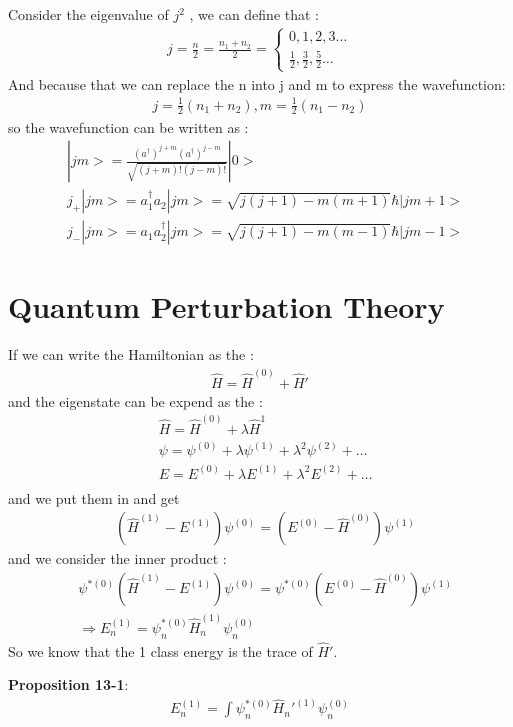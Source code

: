 \documentclass{article}
\begin{document}
Consider the eigenvalue of $j^2$ , we can define that :
\begin{align}
  j=\frac n2=\frac{n_1+n_2}{2}=\begin{cases}
0,1,2,3\dots \\
\frac12,\frac32,\frac52 \dots
  \end{cases}
\end{align}
And because that we can replace the n into j and m to express the wavefunction:
\begin{align}
  j=\frac12(n_1+n_2),m=\frac12(n_1-n_2)
\end{align}
so the wavefunction can be written as :
\begin{align}
  &|jm>=\frac{(a^{\dagger})^{j+m}(a^{\dagger})^{j-m}}{\sqrt{(j+m)!(j-m)!}}|0>\\
  & j_+|jm>=a_1^{\dagger}a_2 |jm>=\sqrt{j(j+1)-m(m+1)}\hbar|jm+1>\\
  & j_-|jm>=a_1a^{\dagger}_2|jm>=\sqrt{j(j+1)-m(m-1)}\hbar|jm-1>
\end{align}

\section{Quantum Perturbation Theory}
If we can write the Hamiltonian as the :
\begin{align}
  \hat H=\hat H^{(0)}+\hat H'
\end{align}
and the eigenstate can be expend as the :
\begin{align}
  &\hat H=\hat H^{(0)}+\lambda\hat H^{1} \\
  &\psi =\psi^{(0)}+\lambda\psi^{(1)}+\lambda^2\psi^{(2)}+\dots \\
  & E=E^{(0)}+\lambda E^{(1)}+\lambda^2E^{(2)}+\dots \\
\end{align}
and we put them in and get 
\begin{align}
  & (\hat H^{(1)}-E^{(1)})\psi^{(0)}=(E^{(0)}-\hat H^{(0)})\psi^{(1)}
\end{align}
and we consider the inner product :
\begin{align}
  &\psi^{*(0)}(\hat H^{(1)}-E^{(1)})\psi^{(0)}=\psi^{*(0)}(E^{(0)}-\hat H^{(0)})\psi^{(1)} \\
  & \Rightarrow E_n^{(1)}= \psi_n^{*(0)}\hat H_n^{(1)}\psi_n^{(0)}
\end{align}
So we know that the 1 class energy is the trace of $\hat H'$.

\textbf{Proposition 13-1}:
\begin{align}
  E_n^{(1)}=\int \psi^{*(0)}_n\hat H_n'^{(1)}\psi^{(0)}_n
\end{align}
\end{document}
